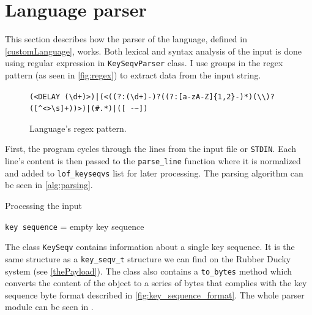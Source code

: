 \section{Language parser}
This section describes how the parser of the language, defined in \autoref{customLanguage}, works. Both lexical and syntax analysis of the input is done using regular expression in \verb|KeySeqvParser| class. I use groups in the regex pattern (as seen in \autoref{fig:regex}) to extract data from the input string.
\begin{figure}[ht]
\centering
\begin{varwidth}{\linewidth}
\footnotesize
\verb=(<DELAY (\d+)>)|(<((?:(\d+)-)?((?:[a-zA-Z]{1,2}-)*)(\\)?([^<>\s]+))>)|(#.*)|([ -~])=
\end{varwidth}
\caption{Language's regex pattern.}
\label{fig:regex}
\end{figure}
First, the program cycles through the lines from the input file or \verb|STDIN|. Each line's content is then passed to the \verb|parse_line| function where it is normalized and added to \verb|lof_keyseqvs| list for later processing. The parsing algorithm can be seen in \autoref{alg:parsing}.
\begin{algorithm}
\caption{Processing the input}
\label{alg:parsing}
\texttt{key sequence} = empty key sequence\;
\end{algorithm}

The class \verb|KeySeqv| contains information about a single key sequence. It is the same structure as a \verb|key_seqv_t| structure we can find on the Rubber Ducky system (see \autoref{thePayload}). The class also contains a \verb|to_bytes| method which converts the content of the object to a series of bytes that complies with the key sequence byte format described in \autoref{fig:key_sequence_format}. The whole parser module can be seen in .

